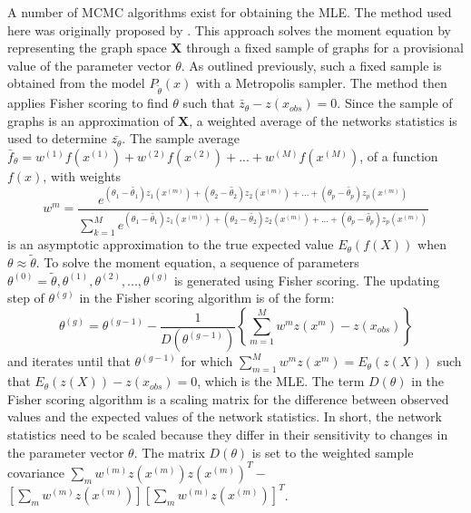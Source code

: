 \documentclass[a4paper, man, floatsintext]{apa6}
\begin{document}
A number of MCMC algorithms exist for obtaining the MLE. The method used here was originally proposed by . \clearpage \noindent This approach solves the moment equation by representing the graph space $\textbf{X}$ through a fixed sample of graphs for a provisional value of the parameter vector $\theta$. As outlined previously, such a fixed sample is obtained from the model $P_{\tilde{\theta}}(x)$ with a Metropolis sampler. The method then applies Fisher scoring to find $\theta$ such that $\bar{z}_\theta − z(x_{obs}) = 0$. Since the sample of graphs is an approximation of $\textbf{X}$, a weighted average of the networks statistics is used to determine $\bar{z_{\theta}}$. The sample average $\bar{f}_{\theta} = w^{(1)}f(x^{(1)}) + w^{(2)}f(x^{(2)}) + ... + w^{(M)}f(x^{(M)})$, of a function $f(x)$, with weights \begin{equation} \label{eqn:eqn6} w^{m} = \frac{e^{(\theta_{1} - \tilde{\theta_{1}})z_{1}(x^{(m)}) + (\theta_{2} - \tilde{\theta_{2}})z_{2}(x^{(m)}) + ... + (\theta_{p} - \tilde{\theta_{p}})z_{p}(x^{(m)})}}{\sum_{k=1}^{M}e^{(\theta_{1} - \tilde{\theta_{1}})z_{1}(x^{(m)}) + (\theta_{2} - \tilde{\theta_{2}})z_{2}(x^{(m)}) + ... + (\theta_{p} - \tilde{\theta_{p}})z_{p}(x^{(m)})}} \end{equation} is an asymptotic approximation to the true expected value $E_{\theta}(f(X))$ when $\theta \approx \tilde{\theta}$. To solve the moment equation, a sequence of parameters $\theta^{(0)} = \tilde{\theta}, \theta^{(1)}, \theta^{(2)}, ..., \theta^{(g)}$ is generated using Fisher scoring. The updating step of $\theta^{(g)}$ in the Fisher scoring algorithm is of the form: \begin{equation} \label{eqn:eqn7} \theta^{(g)} = \theta^{(g-1)} - \frac{1}{D(\theta^{(g-1)})} \left\{\sum_{m=1}^{M}w^{m}z(x^{m}) - z(x_{obs}) \right\} \end{equation} and iterates until that $\theta^{(g-1)}$ for which $\sum_{m=1}^{M}w^{m}z(x^{m}) = E_{\theta}(z(X))$ such that $E_{\theta}(z(X)) - z(x_{obs}) = 0$, which is the MLE. The term $D(\theta)$ in the Fisher scoring algorithm is a scaling matrix for the difference between observed values and the expected values of the network statistics. In short, the network statistics need to be scaled because they differ in their sensitivity to changes in the parameter vector $\theta$. The matrix $D(\theta)$ is set to the weighted sample covariance $\sum_{m}w^{(m)}z(x^{(m)})z(x^{(m)})^{T} - $ \\ \noindent $\left[ \sum_{m}w^{(m)}z(x^{(m)}) \right] \left[ \sum_{m}w^{(m)}z(x^{(m)}) \right]^{T}$. 
\\
\end{document}
